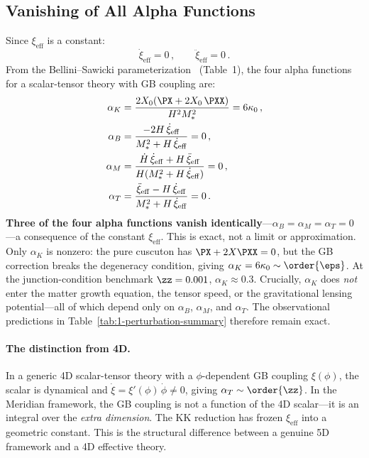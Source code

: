 \subsection{Vanishing of All Alpha Functions}
\label{sec:1-alphaT-vanish}

Since $\xi_{\mathrm{eff}}$ is a constant:
\begin{equation}
\label{eq:1-xi-derivatives}
\dot{\xi}_{\mathrm{eff}} = 0\,, \qquad \ddot{\xi}_{\mathrm{eff}} = 0\,.
\end{equation}
From the Bellini--Sawicki parameterization~\cite{ch1:bellini-sawicki} (Table~1), the four alpha functions for a scalar-tensor theory with GB coupling are:
\begin{subequations}
\label{eq:1-alphas-all}
\begin{align}
\alpha_K &= \frac{2X_0(\PX + 2X_0\,\PXX)}{H^2 M_*^2} = 6\kappa_0\,, \label{eq:1-alphaK}\\
\alpha_B &= \frac{-2H\,\dot{\xi}_{\mathrm{eff}}}{M_*^2 + H\,\dot{\xi}_{\mathrm{eff}}} = 0\,, \label{eq:1-alphaB}\\
\alpha_M &= \frac{\dot{H}\,\dot{\xi}_{\mathrm{eff}} + H\,\ddot{\xi}_{\mathrm{eff}}}{H(M_*^2 + H\,\dot{\xi}_{\mathrm{eff}})} = 0\,, \label{eq:1-alphaM}\\
\alpha_T &= \frac{\ddot{\xi}_{\mathrm{eff}} - H\,\dot{\xi}_{\mathrm{eff}}}{M_*^2 + H\,\dot{\xi}_{\mathrm{eff}}} = 0\,. \label{eq:1-alphaT-eq}
\end{align}
\end{subequations}
\textbf{Three of the four alpha functions vanish identically}---$\alpha_B = \alpha_M = \alpha_T = 0$---a consequence of the constant $\xi_{\mathrm{eff}}$. This is exact, not a limit or approximation. Only $\alpha_K$ is nonzero: the pure cuscuton has $\PX + 2X\PXX = 0$, but the GB correction breaks the degeneracy condition, giving $\alpha_K = 6\kappa_0 \sim \order{\eps}$. At the junction-condition benchmark $\zz = 0.001$, $\alpha_K \approx 0.3$. Crucially, $\alpha_K$ does \emph{not} enter the matter growth equation, the tensor speed, or the gravitational lensing potential---all of which depend only on $\alpha_B$, $\alpha_M$, and $\alpha_T$. The observational predictions in Table~\ref{tab:1-perturbation-summary} therefore remain exact.

\paragraph{The distinction from 4D.} In a generic 4D scalar-tensor theory with a $\phi$-dependent GB coupling $\xi(\phi)$, the scalar is dynamical and $\dot{\xi} = \xi'(\phi)\,\dot{\phi} \neq 0$, giving $\alpha_T \sim \order{\zz}$. In the Meridian framework, the GB coupling is not a function of the 4D scalar---it is an integral over the \emph{extra dimension}. The KK reduction has frozen $\xi_{\mathrm{eff}}$ into a geometric constant. This is the structural difference between a genuine 5D framework and a 4D effective theory.

